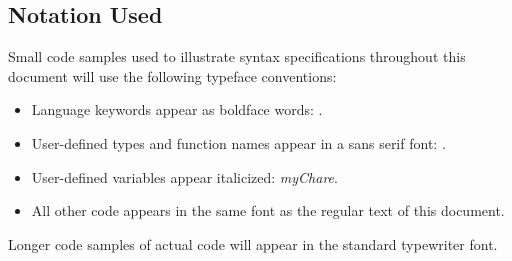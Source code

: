 \subsection{Notation Used}

Small code samples used to illustrate syntax specifications throughout
this document will use the following typeface conventions:

\begin{itemize}
\item Language keywords appear as boldface words: .
\item User-defined types and function names appear in a sans serif font:
. 
\item User-defined variables appear italicized: {\it myChare}.
\item All other code appears in the same font as the regular text of
this document.
\end{itemize}

Longer code samples of actual code will appear in the standard
typewriter font. 



